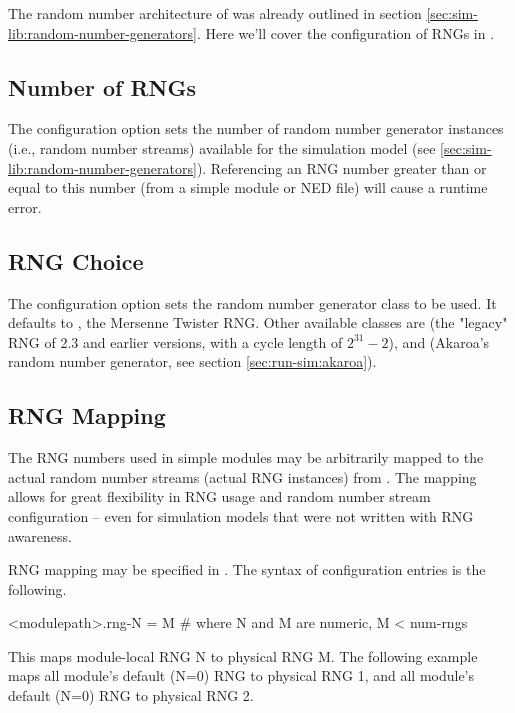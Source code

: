 The random number architecture of {\opp} was already outlined
in section \ref{sec:sim-lib:random-number-generators}. Here
we'll cover the configuration of RNGs in .

\subsection{Number of RNGs}
\label{sec:config-sim:number-of-rngs}

The  configuration option sets the number of
random number generator instances (i.e., random number streams)
available for the simulation model (see \ref{sec:sim-lib:random-number-generators}).
Referencing an RNG number greater than or equal to this number
(from a simple module or NED file) will cause a runtime error.


\subsection{RNG Choice}
\label{sec:config-sim:rng-choice}

The  configuration option sets the random number
generator class to be used. It defaults to ,
the Mersenne Twister RNG. Other available classes are 
(the "legacy" RNG of {\opp} 2.3 and earlier versions, with a cycle length
of $2^{31}-2$), and  (Akaroa's random number generator,
see section \ref{sec:run-sim:akaroa}).

\subsection{RNG Mapping}
\label{sec:config-sim:rng-mapping}

The RNG numbers used in simple modules may be arbitrarily mapped to the
actual random number streams (actual RNG instances) from .
The mapping allows for great flexibility in RNG usage and random number
stream configuration -- even for simulation models that were not
written with RNG awareness.

RNG mapping may be specified in . The syntax of
configuration entries is the following.

\begin{inifile}
[General]
<modulepath>.rng-N = M  # where N and M are numeric, M < num-rngs
\end{inifile}

This maps module-local RNG N to physical RNG M. The following
example maps all  module's default (N=0) RNG to physical RNG 1,
and all  module's default (N=0) RNG to physical RNG 2.

